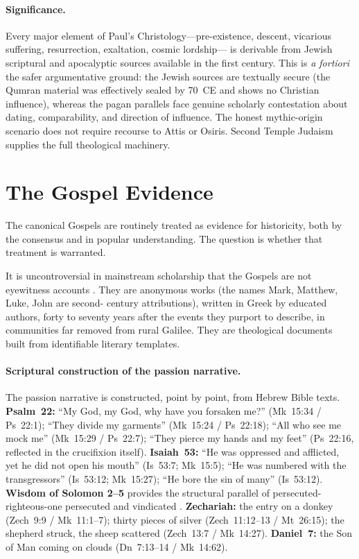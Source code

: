 \documentclass[12pt,oneside]{article}
\begin{document}
\paragraph{Significance.}
Every major element of Paul's Christology---pre-existence, descent,
vicarious suffering, resurrection, exaltation, cosmic lordship---
is derivable from Jewish scriptural and apocalyptic sources
available in the first century.  This is \textit{a fortiori} the
safer argumentative ground: the Jewish sources are textually
secure (the Qumran material was effectively sealed by 70~CE and
shows no Christian influence), whereas the pagan parallels face
genuine scholarly contestation about dating, comparability, and
direction of influence.  The honest mythic-origin scenario does
not require recourse to Attis or Osiris.  Second Temple Judaism
supplies the full theological machinery.

\section{The Gospel Evidence}

The canonical Gospels are routinely treated as evidence for
historicity, both by the consensus and in popular understanding.
The question is whether that treatment is warranted.

It is uncontroversial in mainstream scholarship that the Gospels
are not eyewitness accounts \citep{Ehrman2009}.  They are
anonymous works (the names Mark, Matthew, Luke, John are second-
century attributions), written in Greek by educated authors,
forty to seventy years after the events they purport to describe,
in communities far removed from rural Galilee.  They are
theological documents built from identifiable literary templates.

\paragraph{Scriptural construction of the passion narrative.}
The passion narrative is constructed, point by point, from Hebrew
Bible texts.  \textbf{Psalm~22:} \enquote{My God, my God, why have
you forsaken me?} (Mk~15:34 / Ps~22:1); \enquote{They divide my
garments} (Mk~15:24 / Ps~22:18); \enquote{All who see me mock me}
(Mk~15:29 / Ps~22:7); \enquote{They pierce my hands and my feet}
(Ps~22:16, reflected in the crucifixion itself).
\textbf{Isaiah~53:} \enquote{He was oppressed and afflicted, yet
he did not open his mouth} (Is~53:7; Mk~15:5); \enquote{He was
numbered with the transgressors} (Is~53:12; Mk~15:27);
\enquote{He bore the sin of many} (Is~53:12).
\textbf{Wisdom of Solomon 2--5} provides the structural parallel
of persecuted-righteous-one persecuted and vindicated
\citep{Nickelsburg1972}.  \textbf{Zechariah:} the entry on a
donkey (Zech~9:9 / Mk~11:1--7); thirty pieces of silver
(Zech~11:12--13 / Mt~26:15); the shepherd struck, the sheep
scattered (Zech~13:7 / Mk~14:27).  \textbf{Daniel~7:} the Son of
Man coming on clouds (Dn~7:13--14 / Mk~14:62).
\end{document}
